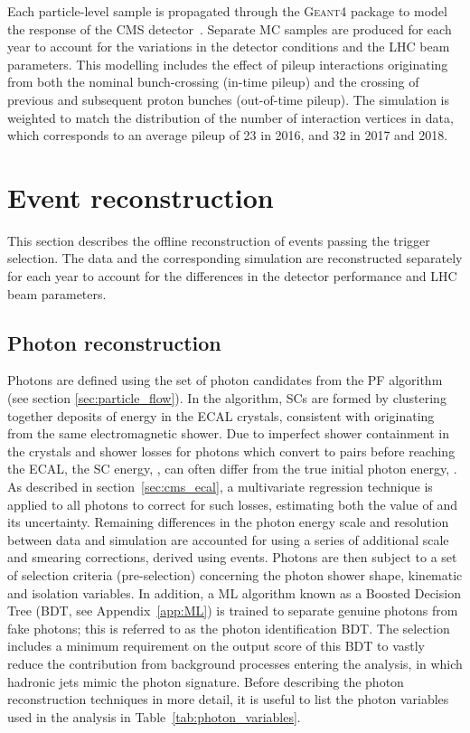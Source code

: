 Each particle-level sample is propagated through the \textsc{Geant4} package to model the response of the CMS detector~\cite{Agostinelli:2002hh}. Separate MC samples are produced for each year to account for the variations in the detector conditions and the LHC beam parameters. This modelling includes the effect of pileup interactions originating from both the nominal bunch-crossing (in-time pileup) and the crossing of previous and subsequent proton bunches (out-of-time pileup). The simulation is weighted to match the distribution of the number of interaction vertices in data, which corresponds to an average pileup of 23 in 2016, and 32 in 2017 and 2018.

\section{Event reconstruction}\label{sec:event_reconstruction}
This section describes the offline reconstruction of events passing the trigger selection. The data and the corresponding simulation are reconstructed separately for each year to account for the differences in the detector performance and LHC beam parameters. 

\subsection{Photon reconstruction}\label{sec:photon_reconstruction}
Photons are defined using the set of photon candidates from the PF algorithm (see section \ref{sec:particle_flow}). In the algorithm, SCs are formed by clustering together deposits of energy in the ECAL crystals, consistent with originating from the same electromagnetic shower. Due to imperfect shower containment in the crystals and shower losses for photons which convert to \ee pairs before reaching the ECAL, the SC energy, \Eraw, can often differ from the true initial photon energy, \Etrue. As described in section~\ref{sec:cms_ecal}, a multivariate regression technique is applied to all photons to correct for such losses, estimating both the value of \Etrue and its uncertainty. Remaining differences in the photon energy scale and resolution between data and simulation are accounted for using a series of additional scale and smearing corrections, derived using \Zee events. Photons are then subject to a set of selection criteria (pre-selection) concerning the photon shower shape, kinematic and isolation variables. In addition, a ML algorithm known as a Boosted Decision Tree (BDT, see Appendix~\ref{app:ML}) is trained to separate genuine photons from fake photons; this is referred to as the photon identification BDT. The selection includes a minimum requirement on the output score of this BDT to vastly reduce the contribution from background processes entering the analysis, in which hadronic jets mimic the photon signature. Before describing the photon reconstruction techniques in more detail, it is useful to list the photon variables used in the \Hgg analysis in Table~\ref{tab:photon_variables}.

